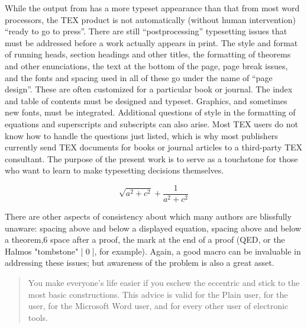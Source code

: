 {While the output from \tex has a more typeset appearance than that
from most word processors, the TEX product is not automatically (without human intervention) \enquote{ready to go to press}. There are still \enquote{postprocessing} typesetting issues that must be addressed before a work
actually appears in print. The style and format of running heads, section headings and other titles, the formatting of theorems and other
enunciations, the text at the bottom of the page, page break issues, and
the fonts and spacing used in all of these go under the name of “page design”. These are often customized for a particular book or journal. The
index and table of contents must be designed and typeset. Graphics,
and sometimes new fonts, must be integrated. Additional questions of
style in the formatting of equations and superscripts and subscripts can
also arise. Most TEX users do not know how to handle the questions just
listed, which is why most publishers currently send TEX documents for
books or journal articles to a third-party TEX consultant. The purpose
of the present work is to serve as a touchstone for those who want to
learn to make typesetting decisions themselves.


\def\smsqr#1#2{\sqrt{{#1}^2 + {#2}^2} + \frac{1}{{#1}^2 + {#2}^2}}

\[ \smsqr{a}{c} \]

There are other aspects of consistency about which many authors
are blissfully unaware: spacing above and below a displayed equation,
spacing above and below a theorem,6
space after a proof, the mark at
the end of a proof (QED, or the Halmos "tombstone" |\qed|, for example).
Again, a good macro can be invaluable in addressing these issues; but
awareness of the problem is also a great asset.

\begin{quotation}
You make everyone's
life easier if you eschew the eccentric and stick to the most basic constructions. This advice is valid for the Plain \tex user, for the \latex
user, for the Microsoft Word user, and for every other user of electronic
tools.
\end{quotation}

}

